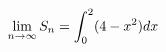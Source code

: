 \documentclass[preview]{standalone}
\begin{document}
\begin{align*}
\special{dvisvgm:raw <g id='unique000'>}\lim_{n \to \infty} S_n = \int_{0}^{2} (4 - x^2) dx\special{dvisvgm:raw </g>}
\end{align*}
\end{document}
